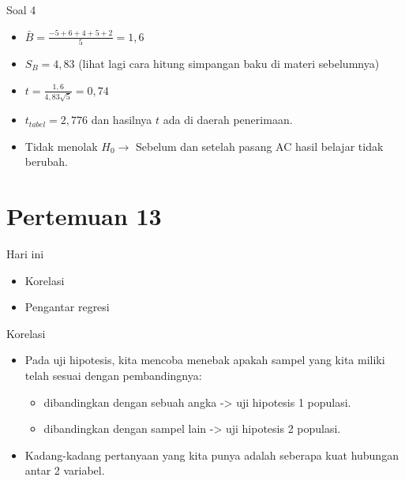 \documentclass[
  ignorenonframetext,
]{beamer}
\begin{document}
\begin{frame}{Soal 4}
\label{soal-4-1}
\begin{itemize}
\item
  \(\bar{B}=\frac{-5+6+4+5+2}{5}=1,6\)
\item
  \(S_B=4,83\) (lihat lagi cara hitung simpangan baku di materi
  sebelumnya)
\item
  \(t=\frac{1,6}{4,83\sqrt{5}}=0,74\)
\item
  \(t_{tabel}=2,776\) dan hasilnya \(t\) ada di daerah penerimaan.
\item
  Tidak menolak \(H_0 \rightarrow\) Sebelum dan setelah pasang AC hasil
  belajar tidak berubah.
\end{itemize}
\end{frame}

\section{Pertemuan 13}\label{pertemuan-13}

\begin{frame}{Hari ini}
\label{hari-ini-3}
\begin{itemize}
\item
  Korelasi
\item
  Pengantar regresi
\end{itemize}
\end{frame}

\begin{frame}{Korelasi}
\label{korelasi}
\begin{itemize}
\item
  Pada uji hipotesis, kita mencoba menebak apakah sampel yang kita
  miliki telah sesuai dengan pembandingnya:

  \begin{itemize}
  \item
    dibandingkan dengan sebuah angka -\textgreater{} uji hipotesis 1
    populasi.
  \item
    dibandingkan dengan sampel lain -\textgreater{} uji hipotesis 2
    populasi.
  \end{itemize}
\item
  Kadang-kadang pertanyaan yang kita punya adalah seberapa kuat hubungan
  antar 2 variabel.
\end{itemize}
\end{frame}
\end{document}
